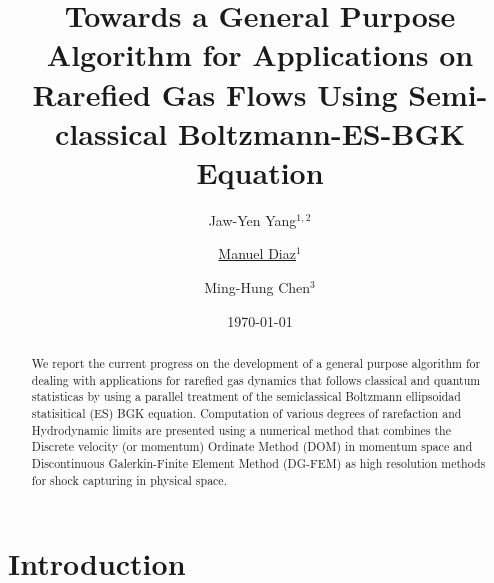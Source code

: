 \documentclass[twoside,twocolumn,prc,floats,amsmath,amssymb]{revtex4} %
\begin{document}
\title{Towards a General Purpose Algorithm for Applications on Rarefied Gas Flows Using Semi-classical Boltzmann-ES-BGK Equation}
\author{ Jaw-Yen Yang$^{1,2}$ } 
\author{ \underline{Manuel Diaz$^{1}$} }
\author{ Ming-Hung Chen$^{3}$ }
\date{\today}

\begin{abstract}
We report the current progress on the development of a general purpose algorithm for dealing with applications for rarefied gas dynamics that follows classical and quantum statisticas by using a parallel treatment of the semiclassical Boltzmann ellipsoidad statisitical (ES) BGK equation. Computation of various degrees of rarefaction and Hydrodynamic limits are presented using a numerical method that combines the Discrete velocity (or momentum) Ordinate Method (DOM) in momentum space and Discontinuous Galerkin-Finite Element Method (DG-FEM) as high resolution methods for shock capturing in physical space.
\end{abstract}

\address{$^{1}$Institute of Applied Mechanics, National Taiwan University, Taipei 106, TAIWAN}
\address{$^{2}$Center of Advanced Study in Theoretical Science, National Taiwan University, Taipei 106, TAIWAN}
\address{$^{3}$Department of Mathematics, National Cheng Kung University, Tainan 70101, TAIWAN}

\maketitle

\section{Introduction}

\label{sec:1}   
\end{document}
